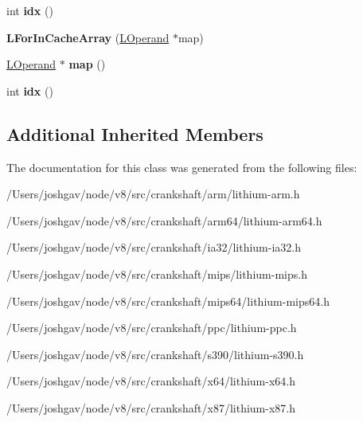 \begin{DoxyCompactItemize}
\item 
int {\bfseries idx} ()\hypertarget{classv8_1_1internal_1_1_l_for_in_cache_array_a4f1aefba1d4e86a27b11b83626c84ac5}{}\label{classv8_1_1internal_1_1_l_for_in_cache_array_a4f1aefba1d4e86a27b11b83626c84ac5}

\item 
{\bfseries L\+For\+In\+Cache\+Array} (\hyperlink{classv8_1_1internal_1_1_l_operand}{L\+Operand} $\ast$map)\hypertarget{classv8_1_1internal_1_1_l_for_in_cache_array_a9240ca2ad504350304a9311010cc344b}{}\label{classv8_1_1internal_1_1_l_for_in_cache_array_a9240ca2ad504350304a9311010cc344b}

\item 
\hyperlink{classv8_1_1internal_1_1_l_operand}{L\+Operand} $\ast$ {\bfseries map} ()\hypertarget{classv8_1_1internal_1_1_l_for_in_cache_array_a9c11e39153e03c3669eb04a6aa4c73cf}{}\label{classv8_1_1internal_1_1_l_for_in_cache_array_a9c11e39153e03c3669eb04a6aa4c73cf}

\item 
int {\bfseries idx} ()\hypertarget{classv8_1_1internal_1_1_l_for_in_cache_array_a4f1aefba1d4e86a27b11b83626c84ac5}{}\label{classv8_1_1internal_1_1_l_for_in_cache_array_a4f1aefba1d4e86a27b11b83626c84ac5}

\end{DoxyCompactItemize}
\subsection*{Additional Inherited Members}


The documentation for this class was generated from the following files\+:\begin{DoxyCompactItemize}
\item 
/\+Users/joshgav/node/v8/src/crankshaft/arm/lithium-\/arm.\+h\item 
/\+Users/joshgav/node/v8/src/crankshaft/arm64/lithium-\/arm64.\+h\item 
/\+Users/joshgav/node/v8/src/crankshaft/ia32/lithium-\/ia32.\+h\item 
/\+Users/joshgav/node/v8/src/crankshaft/mips/lithium-\/mips.\+h\item 
/\+Users/joshgav/node/v8/src/crankshaft/mips64/lithium-\/mips64.\+h\item 
/\+Users/joshgav/node/v8/src/crankshaft/ppc/lithium-\/ppc.\+h\item 
/\+Users/joshgav/node/v8/src/crankshaft/s390/lithium-\/s390.\+h\item 
/\+Users/joshgav/node/v8/src/crankshaft/x64/lithium-\/x64.\+h\item 
/\+Users/joshgav/node/v8/src/crankshaft/x87/lithium-\/x87.\+h\end{DoxyCompactItemize}
